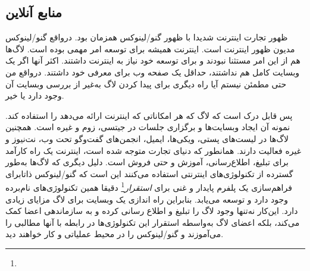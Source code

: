 \subsection{منابع آنلاین}

ظهور تجارت اینترنت شدیدا با ظهور گنو/لینوکس همزمان بود. درواقع
گنو/لینوکس مدیون ظهور اینترنت است. اینترنت همیشه برای توسعه امر مهمی بوده است.
لاگ‌ها هم از این امر مستثنا نبودند و برای توسعه خود نیاز به اینترنت داشتند.
اکثر آنها اگر یک وبسایت کامل هم نداشتند، حداقل یک صفحه وب برای معرفی خود داشتند.
درواقع من حتی مطمئن نیستم آیا راه دیگری برای پیدا کردن لاگ به‌غیر از بررسی وبسایت
آن وجود دارد یا خیر.

پس قابل درک است که لاگ که هر امکاناتی که اینترنت ارائه می‌دهد را استفاده کند.
نمونه آن ایجاد وبسایت‌ها و برگزاری جلسات در جیتسی، زوم و غیره است.
همچنین لاگ‌ها در لیست‌های پستی، ویکی‌ها، ایمیل، انجمن‌های گفت‌وگو تحت وب، نت‌نیوز و غیره
فعالیت دارند.
همانطور که دنیای تجارت متوجه شده است، اینترنت یک راه کارآمد برای تبلیغ، اطلاع‌رسانی،
آموزش و حتی فروش است.
دلیل دیگری که لاگ‌ها به‌طور گسترده از تکنولوژی‌های اینترنتی استفاده می‌کنند این است که
گنو/لینوکس ذاتابرای فراهم‌سازی یک پلفرم پایدار و غنی برای
\emph{استقرار}\footnote{}
دقیقا همین تکنولوژی‌های نام‌برده وجود دارد و توسعه می‌یابد.
بنابراین راه اندازی یک وبسایت برای لاگ مزایای زیادی دارد. این‌کار نه‌تنها وجود لاگ را
تبلیغ و اطلاع رسانی کرده و به سازماندهی اعضا کمک می‌کند، بلکه اعضای لاگ به‌واسطه
استقرار این تکنولوژی‌ها در رابطه با آنها مطالبی را می‌آموزند و گنو/لینوکس را در محیط
عملیاتی و کار خواهند دید.

